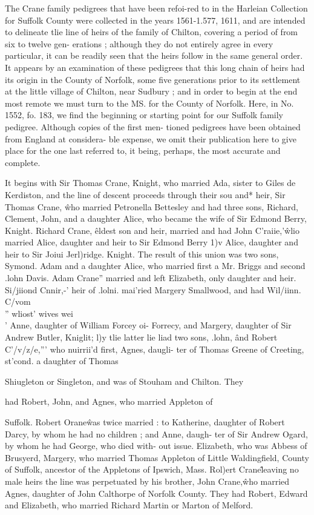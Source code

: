 \documentclass{book}
\begin{document}
The Crane family pedigrees that have been refoi-red to in the 
Harleian Collection for Suffolk County were collected in the years 
1561-1.577, 1611, and are intended to delineate tlie line of heirs of 
the family of Chilton, covering a period of from six to twelve gen- 
erations ; although they do not entirely agree in every particular, 
it can be readily seen that the heirs follow in the same general 
order. It appears by an examination of these pedigrees that this 
long chain of heirs had its origin in the County of Norfolk, some 
five generations prior to its settlement at the little village of 
Chilton, near Sudbury ; and in order to begin at the end most 
remote we must turn to the MS. for the County of Norfolk. 
Here, in No. 1552, fo. 183, we find the beginning or starting point 
for our Suffolk family pedigree. Although copies of the first men- 
tioned pedigrees have been obtained from England at considera- 
ble expense, we omit their publication here to give place for the 
one last referred to, it being, perhaps, the most accurate and 
complete. 

It begins with Sir Thomas Crane, \^ Knight, who married Ada, 
sister to Giles de Kerdiston, and the line of descent proceeds 
through their sou and* heir, Sir Thomas Crane, \^ who married 
Petronella Bettesley and had three sons, Richard, Clement, John, 
and a daughter Alice, who became the wife of Sir Edmond Berry, 
Knight. Richard Crane, \^ eldest son and heir, married and had 
John C'raiie,'\^ wlio married Alice, daughter and heir to Sir 
Edmond Berry 1)v Alice, daughter and heir to Sir Joiui Jerl)ridge. 
Knight. The result of this union was two sons, Symond. Adam 
and a daughter Alice, who married first a Mr. Briggs and second 
.lohn Davis. Adam Crane'' married and left Elizabeth, only 
daughter and heir. Si/jiiond Cnnir,-' heir of .lolni. mai'ried 
Margery Smallwood, and had Wil/iinn. C/vom\\'' wliost' wives wei\\' 
Anne, daughter of William Forcey oi- Forrecy, and Margery, 
daughter of Sir Andrew Butler, Kniglit; l)y tlie latter lie liad two 
sons, .lohn, \^ and Robert C'/v/z/e,''' who nuirrii'd first, Agnes, daugli- 
ter of Thomas Greene of Creeting, st'cond. a daughter of Thomas 




Shiugleton or Singleton, and was of Stouham and Chilton. They 

had Robert, John, and Agnes, who married Appleton of 

Suffolk. Robert Orane\^ was twice married : to Katherine, daughter 
of Robert Darcy, by whom he had no children ; and Anne, daugh- 
ter of Sir Andrew Ogard, by whom he had George, who died with- 
out issue. Elizabeth, who was Abbess of Brusyerd, Margery, 
who married Thomas Appleton of Little Waldingfield, County of 
Suffolk, ancestor of the Appletons of Ipswich, Mass. Rol)ert 
Crane\^ leaving no male heirs the line was perpetuated by his 
brother, John Crane,\^ who married Agnes, daughter of John 
Calthorpe of Norfolk County. They had Robert, Edward and 
Elizabeth, who married Richard Martin or Marton of Melford. 
\end{document}
